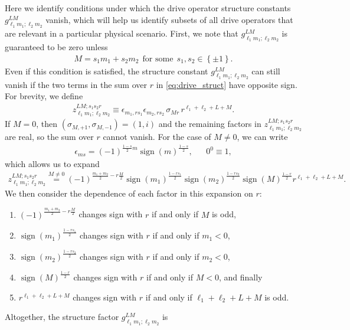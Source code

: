 \documentclass[nofootinbib,notitlepage,11pt]{revtex4-2}
\renewcommand{\t}{\text} %
\newcommand{\p}[1]{\left(#1\right)} %
\renewcommand{\set}[1]{\left\{#1\right\}} %
\newcommand{\1}{\mathds{1}}
\DeclareMathOperator{\sign}{sign}
\begin{document}
Here we identify conditions under which the drive operator structure
constants $g_{\ell_1m_1;\ell_2m_2}^{LM}$ vanish, which will help us
identify subsets of all drive operators that are relevant in a
particular physical scenario.  First, we note that
$g_{\ell_1m_1;\ell_2m_2}^{LM}$ is guaranteed to be zero unless
\begin{align}
  M = s_1 m_1 + s_2 m_2 ~~ \t{for some} ~~ s_1,s_2\in\set{\pm1}.
\end{align}
Even if this condition is satisfied, the structure constant
$g_{\ell_1m_1;\ell_2m_2}^{LM}$ can still vanish if the two terms in
the sum over $r$ in \eqref{eq:drive_struct} have opposite sign.  For
brevity, we define
\begin{align}
  z_{\ell_1m_1;\ell_2m_2}^{LM;s_1s_2r}
  \equiv \epsilon_{m_1,r s_1} \epsilon_{m_2,r s_2} \,
  \sigma_{Mr} \, r^{\ell_1+\ell_2+L+M}.
\end{align}
If $M=0$, then $\p{\sigma_{M,+1},\sigma_{M,-1}}=\p{1,i}$ and the
remaining factors in $z_{\ell_1m_1;\ell_2m_2}^{LM;s_1s_2r}$ are real,
so the sum over $r$ cannot vanish.  For the case of $M\ne0$, we can
write
\begin{align}
  \epsilon_{ms} = \p{-1}^{\frac{1-s}{2}m} \sign\p{m}^{\frac{1-s}{2}},
  &&
  0^0 \equiv 1,
\end{align}
which allows us to expand
\begin{align}
  z_{\ell_1m_1;\ell_2m_2}^{LM;s_1s_2r}
  \stackrel{M\ne0}{=} \p{-1}^{\frac{m_1+m_2}{2}-r\frac{M}{2}}
  \sign\p{m_1}^{\frac{1-rs_1}{2}} \sign\p{m_2}^{\frac{1-rs_2}{2}}
  \sign\p{M}^{\frac{1-r}{2}} r^{\ell_1+\ell_2+L+M}.
\end{align}
We then consider the dependence of each factor in this expansion on
$r$:
\begin{enumerate}
\item $\p{-1}^{\frac{m_1+m_2}{2}-r\frac{M}{2}}$ changes sign with $r$
  if and only if $M$ is odd,
\item $\sign\p{m_1}^{\frac{1-rs_1}{2}}$ changes sign with $r$ if and
  only if $m_1<0$,
\item $\sign\p{m_2}^{\frac{1-rs_2}{2}}$ changes sign with $r$ if and
  only if $m_2<0$,
\item $\sign\p{M}^{\frac{1-r}{2}}$ changes sign with $r$ if and only
  if $M<0$, and finally
\item $r^{\ell_1+\ell_2+L+M}$ changes sign with $r$ if and only if
  $\ell_1+\ell_2+L+M$ is odd.
\end{enumerate}
Altogether, the structure factor $g_{\ell_1m_1;\ell_2m_2}^{LM}$ is
\end{document}
